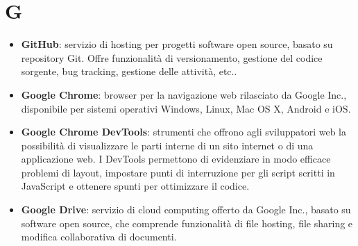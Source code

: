 \section{G}
\begin{itemize}
	\item \textbf{GitHub}: servizio di hosting per progetti software open source, basato su repository Git. Offre funzionalità di versionamento, gestione del codice sorgente, bug tracking, gestione delle attività, etc..
	\item \textbf{Google Chrome}: browser per la navigazione web rilasciato da Google Inc., disponibile per sistemi operativi Windows, Linux, Mac OS X, Android e iOS. 
	\item \textbf{Google Chrome DevTools}: strumenti che offrono agli sviluppatori web la possibilità di visualizzare le parti interne di un sito internet o di una applicazione web. I DevTools permettono di evidenziare in modo efficace problemi di layout, impostare punti di interruzione per gli script scritti in JavaScript e ottenere spunti per ottimizzare il codice.
	\item \textbf{Google Drive}: servizio di cloud computing offerto da Google Inc., basato su software open source, che comprende funzionalità di file hosting, file sharing e modifica collaborativa di documenti.
\end{itemize}
